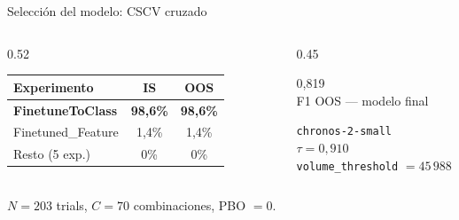 \documentclass[aspectratio=169, spanish, 12pt]{beamer}
\newcommand{\kpi}[3]{%
  \begin{tcolorbox}[kpibox=#1, halign=center]
    {\Large\color{#1}#2}\\[1pt]
    {\small\color{#1!70}#3}
  \end{tcolorbox}%
}
\begin{document}
\begin{frame}{Selección del modelo: CSCV cruzado}
  \begin{columns}[T]
    \begin{column}{0.52\textwidth}
      \begin{tabular}{lcc}
        \toprule
        \textbf{Experimento} & \textbf{IS} & \textbf{OOS} \\
        \midrule
        \rowcolor{coltrans!25!black}
        \textbf{FinetuneToClass} & \textbf{98,6\%} & \textbf{98,6\%} \\
        Finetuned\_Feature   & 1,4\%  & 1,4\%  \\
        Resto (5 exp.)       & 0\%    & 0\%    \\
        \bottomrule
      \end{tabular}
      \vspace{0.5em}\\
      \small $N{=}203$ trials, $C{=}70$ combinaciones, PBO $= 0$.
    \end{column}
    \begin{column}{0.45\textwidth}
      \kpi{coltrans}{0,819}{F1 OOS — modelo final}
      \vspace{0.5em}
      \begin{tcolorbox}[familybox=coltrans]
        \small\texttt{chronos-2-small}\\
        $\tau = 0{,}910$\\
        \texttt{volume\_threshold} $= 45\,988$
      \end{tcolorbox}
    \end{column}
  \end{columns}
\end{frame}
\end{document}
